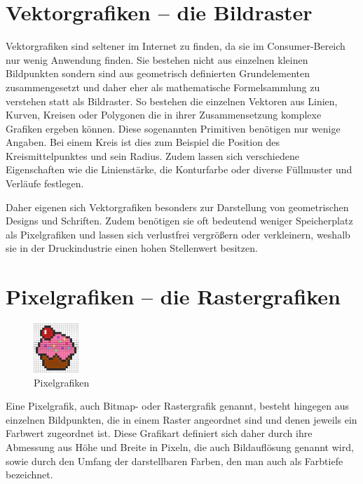 \section{Vektorgrafiken – die Bildraster}
\label{sec:vektorgrafiken_-_die_bildraster}

Vektorgrafiken sind seltener im Internet zu finden, da sie im Consumer-Bereich nur wenig Anwendung finden. Sie bestehen nicht aus einzelnen kleinen Bildpunkten sondern sind aus geometrisch definierten Grundelementen zusammengesetzt und daher eher als mathematische Formelsammlung zu verstehen statt als Bildraster. So bestehen die einzelnen Vektoren aus Linien, Kurven, Kreisen oder Polygonen die in ihrer Zusammensetzung komplexe Grafiken ergeben können. Diese sogenannten Primitiven benötigen nur wenige Angaben. Bei einem Kreis ist dies zum Beispiel die Position des Kreismittelpunktes und sein Radius. Zudem lassen sich verschiedene Eigenschaften wie die Linienstärke, die Konturfarbe oder diverse Füllmuster und Verläufe festlegen.

Daher eigenen sich Vektorgrafiken besonders zur Darstellung von geometrischen Designs und Schriften. Zudem benötigen sie oft bedeutend weniger Speicherplatz als Pixelgrafiken und lassen sich verlustfrei vergrößern oder verkleinern, weshalb sie in der Druckindustrie einen hohen Stellenwert besitzen.

\section{Pixelgrafiken – die Rastergrafiken}
\label{sec:pixelgrafiken_-_die_rastergrafiken}

\begin{figure}
\centering
\includegraphics[width=0.15\textwidth]{img/k1_pixel_img.jpg}
\caption{\label{fig:frog1}Pixelgrafiken}
\end{figure}

Eine Pixelgrafik, auch Bitmap- oder Rastergrafik genannt, besteht hingegen aus einzelnen Bildpunkten, die in einem Raster angeordnet sind und denen jeweils ein Farbwert zugeordnet ist. Diese Grafikart definiert sich daher durch ihre Abmessung aus Höhe und Breite in Pixeln, die auch Bildauflösung genannt wird, sowie durch den Umfang der darstellbaren Farben, den man auch als Farbtiefe bezeichnet.


